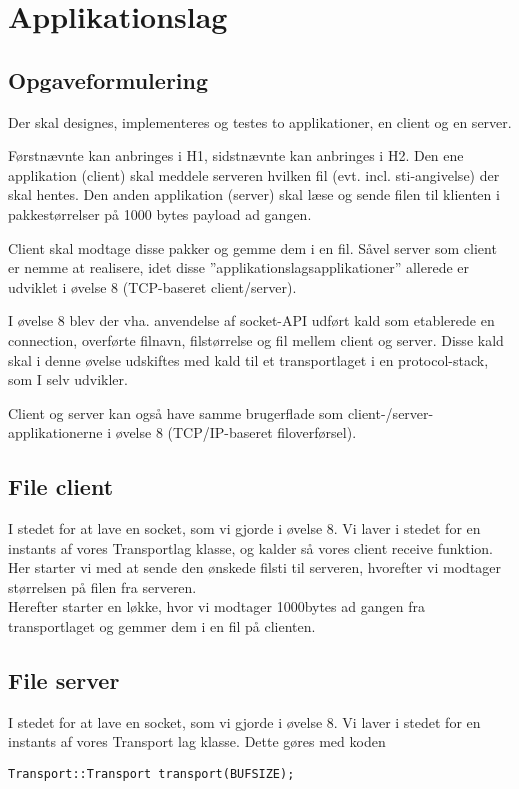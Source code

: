\chapter{Applikationslag}

\section{Opgaveformulering}

Der skal designes, implementeres og testes to applikationer, en client og en server.

Førstnævnte kan anbringes i H1, sidstnævnte kan anbringes i H2.
Den ene applikation (client) skal meddele serveren hvilken fil (evt. incl. sti-angivelse) der skal hentes.
Den anden applikation (server) skal læse og sende filen til klienten i pakkestørrelser på 1000 bytes payload ad gangen.

Client skal modtage disse pakker og gemme dem i en fil.
Såvel server som client er nemme at realisere, idet disse ”applikationslagsapplikationer” allerede er udviklet i øvelse 8 (TCP-baseret client/server).

I øvelse 8 blev der vha. anvendelse af socket-API udført kald som etablerede en connection, overførte filnavn, filstørrelse og fil mellem client og server. Disse kald skal i denne øvelse udskiftes med kald til et transportlaget i en protocol-stack, som I selv udvikler. 

Client og server kan også have samme brugerflade som client-/server-applikationerne i øvelse 8 (TCP/IP-baseret filoverførsel).

\section{File client}

I stedet for at lave en socket, som vi gjorde i øvelse 8. Vi laver i stedet for en instants af vores Transportlag klasse, og kalder så vores client receive funktion. Her starter vi med at sende den ønskede filsti til serveren, hvorefter vi modtager størrelsen på filen fra serveren. \\ Herefter starter en løkke, hvor vi modtager 1000bytes ad gangen fra transportlaget og gemmer dem i en fil på clienten.

\section{File server}

I stedet for at lave en socket, som vi gjorde i øvelse 8. Vi laver i stedet for en instants af vores Transport lag klasse. Dette gøres med koden 

\begin{lstlisting}
Transport::Transport transport(BUFSIZE);
\end{lstlisting}





 




 

